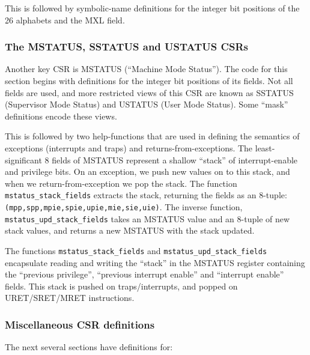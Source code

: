 \documentclass[11pt]{article}
\begin{document}


This is followed by symbolic-name definitions for the integer bit
positions of the 26 alphabets and the MXL field.




\subsubsection{The MSTATUS, SSTATUS and USTATUS CSRs}

Another key CSR is MSTATUS (``Machine Mode Status'').  The code for
this section begins with definitions for the integer bit positions of
its fields.  Not all fields are used, and more restricted views of
this CSR are known as SSTATUS (Supervisor Mode Status) and USTATUS
(User Mode Status).  Some ``mask'' definitions encode these views.

This is followed by two help-functions that are used in defining the
semantics of exceptions (interrupts and traps) and
returns-from-exceptions.  The least-significant 8 fields of MSTATUS
represent a shallow ``stack'' of interrupt-enable and privilege
bits. On an exception, we push new values on to this stack, and when
we return-from-exception we pop the stack. The function
\verb|mstatus_stack_fields| extracts the stack, returning the fields
as an 8-tuple: \verb|(mpp,spp,mpie,spie,upie,mie,sie,uie)|.  The
inverse function, \verb|mstatus_upd_stack_fields| takes an MSTATUS
value and an 8-tuple of new stack values, and returns a new MSTATUS
with the stack updated.

The functions \verb|mstatus_stack_fields| and
\verb|mstatus_upd_stack_fields| encapsulate reading and writing the
``stack'' in the MSTATUS register containing the ``previous
privilege'', ``previous interrupt enable'' and ``interrupt enable''
fields.  This stack is pushed on traps/interrupts, and popped on
URET/SRET/MRET instructions.


\subsubsection{Miscellaneous CSR definitions}

The next several sections have definitions for:
\end{document}
